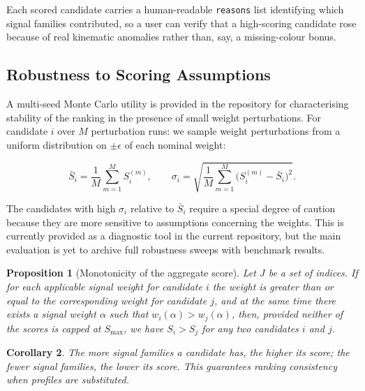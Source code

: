 \documentclass[preprint,12pt,authoryear]{elsarticle}
\newtheorem{prop}{Proposition}
\newtheorem{cor}[prop]{Corollary}
\begin{document}
Each scored candidate carries a human-readable \texttt{reasons} list identifying which signal families contributed, so a user can verify that a high-scoring candidate rose because of real kinematic anomalies rather than, say, a missing-colour bonus.

\subsection{Robustness to Scoring Assumptions}
\label{sec:robustness}

A multi-seed Monte Carlo utility is provided in the repository for characterising stability of the ranking in the presence of small weight perturbations. For candidate $i$ over $M$ perturbation runs: we sample weight perturbations from a uniform distribution on $\pm\epsilon$ of each nominal weight:

\begin{equation}
\bar{S}_i = \frac{1}{M}\sum_{m=1}^{M} S_i^{(m)},
\qquad
\sigma_i = \sqrt{\frac{1}{M}\sum_{m=1}^{M}\bigl(S_i^{(m)} - \bar{S}_i\bigr)^2}.
\label{eq:robustness}
\end{equation}

The candidates with high $\sigma_i$ relative to $\bar{S}_i$ require a special degree of caution because they are more sensitive to assumptions concerning the weights. This is currently provided as a diagnostic tool in the current repository, but the main evaluation is yet to archive full robustness sweeps with benchmark results.

\begin{prop}[Monotonicity of the aggregate score]
Let $J$ be a set of indices. If for each applicable signal weight for candidate $i$ the weight is greater than or equal to the corresponding weight for candidate $j$, and at the same time there exists a signal weight $\alpha$ such that $w_i(\alpha) > w_j(\alpha)$, then, provided neither of the scores is capped at $S_{\max}$, we have $S_i > S_j$ for any two candidates $i$ and $j$.
\end{prop}
\begin{cor}
The more signal families a candidate has, the higher its score; the fewer signal families, the lower its score. This guarantees ranking consistency when profiles are substituted.
\end{cor}


\end{document}
